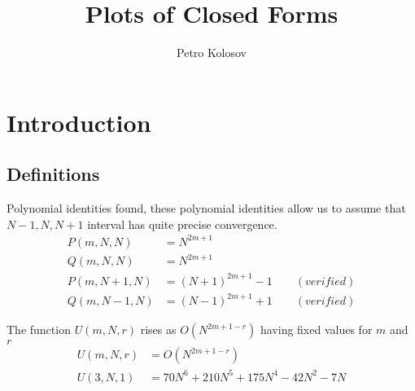 \documentclass[12pt,letterpaper,oneside,reqno]{amsart}
\title[Plots of Closed Forms]
{Plots of Closed Forms}
\author[Petro Kolosov]{Petro Kolosov}
\newcommand \coeffA [3][A] {{\mathbf{#1}} \sb{#2,#3}}
\newcommand \polynomialP [4][P]{{#1}(#2,#3,#4)}
\newcommand \polynomialQ [4][Q]{{#1}(#2,#3,#4)}
\begin{document}
    \begin{abstract}
        
    \end{abstract}

    \maketitle

    \tableofcontents


    \section{Introduction}\label{sec:introduction}
    \subsection{Definitions}
    

    Polynomial identities found, these polynomial identities allow us to assume that $N-1, N, N+1$ interval
    has quite precise convergence.
    \begin{align*}
        \polynomialP{m}{N}{N} &= N^{2m+1} \\
        \polynomialQ{m}{N}{N} &= N^{2m+1} \\
        \polynomialP{m}{N+1}{N} &= (N+1)^{2m+1} - 1 \quad \quad (verified) \\
        \polynomialQ{m}{N-1}{N} &= (N-1)^{2m+1} + 1 \quad \quad (verified)
    \end{align*}

    The function $U(m, N, r)$ rises as $O(N^{2m+1-r})$ having fixed values for $m$ and $r$
    \begin{align*}
        U(m, N, r) &= O(N^{2m+1-r}) \\
        U(3, N, 1) &= 70 N^6+210 N^5+175 N^4-42 N^2-7 N
    \end{align*}
\end{document}
